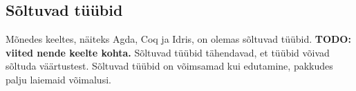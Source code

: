 \documentclass[12pt]{article}
\newcommand\markus[1]{\textcolor{roheline}{\textbf{#1}}}
\begin{document}
    \subsection{Sõltuvad tüübid}\label{soltuvad}
      Mõnedes keeltes, näiteks Agda, Coq ja Idris, on olemas sõltuvad tüübid. \markus{TODO: viited nende keelte kohta.} Sõltuvad tüübid tähendavad, et tüübid võivad sõltuda väärtustest. Sõltuvad tüübid on võimsamad kui edutamine, pakkudes palju laiemaid võimalusi.
\begin{comment}
 \begin{frame}[fragile]{About Idris}
    \begin{itemize}
      \item
        Purely functional
      \item
        Dependent types
      \item
        Strict by default; optional laziness
      \item
        Totality checking
      \item
        Easy management of side effects
      \item
        Support for EDSL-s
      \item
        Syntax similar to Haskell
      \item
        Parametric polymorphism
      \item
        GADT-s
      \item
        Interfaces
    \end{itemize}
  \end{frame}
  \begin{frame}[fragile]{Creating data types}
    \begin{verbatim}
data List t = Cons t (List t) | Nil
    \end{verbatim}
    \begin{verbatim}
data List : Type -> Type where
  (::) : t -> List t -> List t
  Nil : List t
    \end{verbatim}
  \end{frame}
  \begin{frame}[fragile]{Totality checking and assertions}
    \begin{verbatim}
fromInteger x =
  if x == 0 then
    Z
  else
    S (fromInteger (assert_smaller x (x - 1)))
    \end{verbatim}
  \end{frame}
  \begin{frame}[fragile]{Dependent types}
    \begin{verbatim}
data Vect : Nat -> Type -> Type where

\end{comment}
\end{document}
